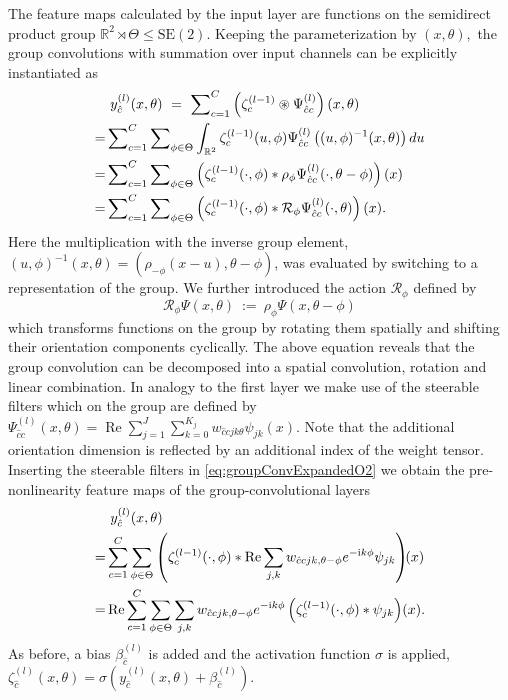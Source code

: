 \documentclass[10pt,twocolumn,letterpaper]{article}
\newcommand{\real}{\operatorname{Re}}
\newcommand{\ci}{\mathrm{i}}
\newcommand{\R}{\mathbb{R}}
\begin{document}
The feature maps calculated by the input layer are functions on the semidirect product group $\R^2\rtimes\Theta\leq\text{SE}(2).$
Keeping the parameterization by $(x,\theta),$ the group convolutions
with summation over input channels
can be explicitly instantiated as
\allowdisplaybreaks
\begin{align}\label{eq:groupConvExpandedO2}
	&\ y_{\hat{c}}^{(l)}(x,\theta)\ =\ \sum\nolimits_{c=1}^{C}\left(\zeta_c^{(l-1)} \circledast \Psi_{\hat{c}c}^{(l)}\right)(x, \theta) \\
	=& \sum\nolimits_{c=1}^{C}\sum\nolimits_{\phi \in \Theta} \int_{\R^2} \zeta_c^{(l-1)}(u, \phi)\Psi_{\hat{c}c}^{(l)}\left((u,\phi)^{-1}(x,\theta)\right) du \notag\\
	=& \sum\nolimits_{c=1}^{C}\sum\nolimits_{\phi \in \Theta} \left(\zeta_c^{(l-1)}(\cdot, \phi) * \rho_{\phi}\Psi_{\hat{c}c}^{(l)}(\cdot, \theta - \phi)\right)(x) \notag\\
	=& \sum\nolimits_{c=1}^{C}\sum\nolimits_{\phi \in \Theta} \left(\zeta_c^{(l-1)}(\cdot, \phi) * \mathcal{R}_{\phi}\Psi_{\hat{c}c}^{(l)}(\cdot, \theta)\right)(x).\notag
\end{align}
Here the multiplication with the inverse group element, $(u,\phi)^{-1}(x,\theta) = (\rho_{-\phi}(x-u), \theta-\phi)$, was evaluated by switching to a representation of the group.
We further introduced the action $\mathcal{R}_{\phi}$ defined by
\[
	\mathcal{R}_{\phi} \Psi(x,\theta) \ :=\ \rho_{\phi} \Psi(x,\theta-\phi)
\]
which transforms functions on the group by rotating them spatially and shifting their orientation components cyclically.
The above equation reveals that the group convolution can be decomposed into a spatial convolution, rotation and linear combination.
In analogy to the first layer we make use of the steerable filters which on the group are defined by
$
	\Psi_{\hat{c}c}^{(l)}(x, \theta) = \real \sum\nolimits_{j=1}^{J} \sum\nolimits_{k=0}^{K_j} w_{\hat{c}cjk\theta} \psi_{jk}(x).
$
Note that the additional orientation dimension is reflected by an additional index of the weight tensor.
Inserting the steerable filters in \eqref{eq:groupConvExpandedO2} we obtain the pre-nonlinearity feature maps of the group-convolutional layers
\begin{align}\label{eq:groupConvFilter}
	&\ y^{(l)}_{\hat{c}}(x,\theta) \\
	=& \sum_{c=1}^{C} \sum_{\phi\in\Theta} \left( \zeta_c^{(l-1)}(\cdot, \phi) \ast \real \sum_{j,k} w_{\hat{c}cjk,\theta-\phi} e^{- \ci k\phi} \psi_{jk}\right)\!\!(x)\notag\\
	=& \real \sum_{c=1}^{C} \sum_{\phi\in\Theta} \sum_{j,k} w_{\hat{c}cjk,\theta-\phi} e^{- \ci k\phi} \left(\zeta_c^{(l-1)}(\cdot, \phi) * \psi_{jk}\right)\!(x).\notag
\end{align}
As before, a bias $\beta^{(l)}_{\hat{c}}$ is added and the activation function $\sigma$ is applied,
$\zeta^{(l)}_{\hat{c}}(x,\theta) = \sigma(y^{(l)}_{\hat{c}}(x,\theta) + \beta^{(l)}_{\hat{c}}).$
\end{document}
